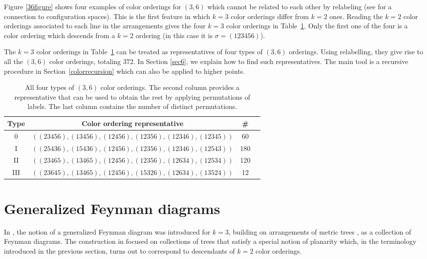 \documentclass[pdftex]{sigma}
\theoremstyle{definition}
\numberwithin{equation}{section}
\begin{document}
Figure \ref{36figure} shows four examples of color orderings for $(3,6)$ which cannot be related to each other by relabeling (see \cite[Chapter 8]{yoshida2013hypergeometric} for a connection to configuration spaces). This is the first feature in which $k=3$ color orderings differ from $k=2$ ones. Reading the $k=2$ color orderings associated to each line in the arrangements gives the four $k=3$ color orderings in Table~\ref{table36}. Only the first one of the four is a color ordering which descends from a $k=2$ ordering (in this case it is $\sigma = (123456)$).

The $k=3$ color orderings in Table~\ref{table36} can be treated as representatives of four types of $(3,6)$ orderings. Using relabelling, they give rise to all the $(3,6)$ color orderings, totaling $372$. In Section \ref{sec6}, we explain how to find such representatives.
The main tool is a recursive procedure in Section~\ref{colorrecursion} which can also be applied to higher points.

\begin{table}[!htb]\renewcommand{\arraystretch}{1.2}
 \centering
\begin{tabular}{|c|c|c|c|}\hline
Type & Color ordering representative & \# \\ \hline
0 & $((2 3 4 5 6),(1 3 4 5 6),(1 2 4 5 6),(1 2 3 5 6),(1 2 3 4 6),(1 2 3 4 5))$ & 60 \\
I & $((2 5 4 3 6),(1 5 4 3 6),(1 2 4 5 6),(1 2 3 5 6),(1 2 3 4 6),(1 2 5 4 3))$ & 180 \\
II & $((2 3465 ),(1 3465 ),(1 2 4 5 6),(1 2 3 5 6),(1 2 6 3 4),(1 2 5 3 4))$ & 120\\
III & $((2 3645 ),(1 3465 ),(1 2 4 5 6),(1 5 3 2 6),(1 2 6 3 4),(1 3524 ))$ & 12 \\ \hline
\end{tabular}
 \caption{All four types of $(3,6)$ color orderings. %
 The second column provides a representative that can be used to obtain the rest by applying permutations of labels. The last column contains the number of distinct permutations. \label{table36}}
\end{table}

\section{Generalized Feynman diagrams}\label{sec4}

In \cite{Borges:2019csl}, the notion of a generalized Feynman diagram was introduced for $k=3$, building on arrangements of metric trees \cite{herrmann2008draw}, as a collection of Feynman diagrams. The construction in \cite{Borges:2019csl} focused on collections of trees that satisfy a special notion of planarity which, in the terminology introduced in the previous section, turns out to correspond to descendants of $k=2$ color orderings.
\end{document}
